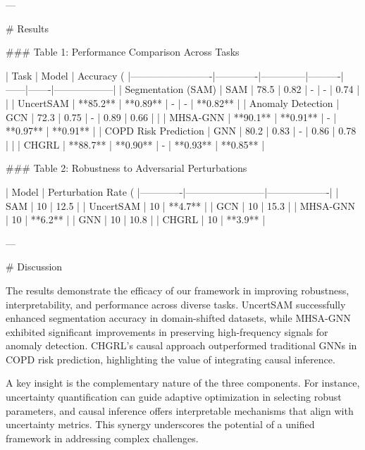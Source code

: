 ---

# Results

### Table 1: Performance Comparison Across Tasks

| Task                    | Model       | Accuracy (%
|-------------------------|-------------|--------------|----------|------|-------|------------------|
| Segmentation (SAM)      | SAM         | 78.5         | 0.82     | -    | -     | 0.74             |
|                         | UncertSAM   | **85.2**     | **0.89** | -    | -     | **0.82**         |
| Anomaly Detection       | GCN         | 72.3         | 0.75     | -    | 0.89  | 0.66             |
|                         | MHSA-GNN    | **90.1**     | **0.91** | -    | **0.97** | **0.91**         |
| COPD Risk Prediction    | GNN         | 80.2         | 0.83     | -    | 0.86  | 0.78             |
|                         | CHGRL       | **88.7**     | **0.90** | -    | **0.93** | **0.85**         |

### Table 2: Robustness to Adversarial Perturbations

| Model       | Perturbation Rate (%
|-------------|------------------------|-------------------|
| SAM         | 10                     | 12.5              |
| UncertSAM   | 10                     | **4.7**           |
| GCN         | 10                     | 15.3              |
| MHSA-GNN    | 10                     | **6.2**           |
| GNN         | 10                     | 10.8              |
| CHGRL       | 10                     | **3.9**           |

---

# Discussion

The results demonstrate the efficacy of our framework in improving robustness, interpretability, and performance across diverse tasks. UncertSAM successfully enhanced segmentation accuracy in domain-shifted datasets, while MHSA-GNN exhibited significant improvements in preserving high-frequency signals for anomaly detection. CHGRL's causal approach outperformed traditional GNNs in COPD risk prediction, highlighting the value of integrating causal inference.

A key insight is the complementary nature of the three components. For instance, uncertainty quantification can guide adaptive optimization in selecting robust parameters, and causal inference offers interpretable mechanisms that align with uncertainty metrics. This synergy underscores the potential of a unified framework in addressing complex challenges.

